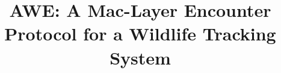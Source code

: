 \documentclass[conference,10pt]{IEEEtran}
\newcommand{\pName}{AWE}
\begin{document}
\title{{\pName}: A Mac-Layer Encounter Protocol for a Wildlife Tracking System}



\maketitle







% 













\end{document}
